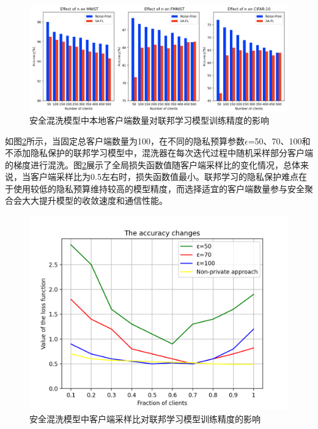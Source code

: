 \begin{figure}[!hbt]
\centering
  	\includegraphics[scale=0.37]{fig2/C4/SA-FL1}%
	\caption{安全混洗模型中本地客户端数量对联邦学习模型训练精度的影响}
  	\label{fig:安全混洗模型中参与混洗的本地客户端数量对联合模型精度的影响} 
\end{figure}

如图\ref{fig:安全混洗模型中客户端采样比对联邦学习模型精度的影响}所示，当固定总客户端数量为100，在不同的隐私预算参数$\epsilon$=50、70、100和不添加隐私保护的联邦学习模型中，混洗器在每次迭代过程中随机采样部分客户端的梯度进行混洗。图\ref{fig:安全混洗模型中客户端采样比对联邦学习模型精度的影响}展示了全局损失函数值随客户端采样比的变化情况，总体来说，当客户端采样比为0.5左右时，损失函数值最小。联邦学习的隐私保护难点在于使用较低的隐私预算维持较高的模型精度，而选择适宜的客户端数量参与安全聚合会大大提升模型的收敛速度和通信性能。

\begin{figure}[!hbt]
\centering
  	\includegraphics[scale=0.6]{fig2/C4/实验一客户端采样比}%
	\caption{安全混洗模型中客户端采样比对联邦学习模型训练精度的影响}
  	\label{fig:安全混洗模型中客户端采样比对联邦学习模型精度的影响} 
\end{figure}

